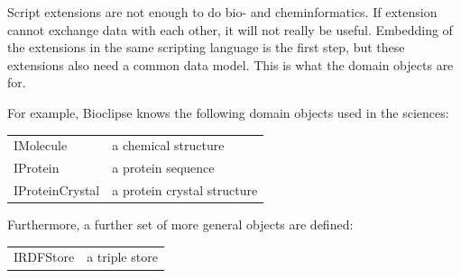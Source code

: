 \documentclass[a5paper, 10pt]{memoir}
\begin{document}
\begin{refsection}
Script extensions are not enough to do bio- and cheminformatics. If extension
cannot exchange data with each other, it will not really be useful. Embedding
of the extensions in the same scripting language is the first step, but
these extensions also need a common data model. This is what the domain objects are
for.

For example, Bioclipse knows the following domain objects used in the sciences:

\vspace{0.25cm}
\begin{tabular}{ l l }
  IMolecule\index{IMolecule}\index{molecule} & a chemical structure \\
  IProtein\index{IProtein}\index{protein} & a protein sequence \\
  IProteinCrystal\index{IProteinCrystal} & a protein crystal structure \\
\end{tabular}
\vspace{0.25cm}

Furthermore, a further set of more general objects are defined:

\vspace{0.25cm}
\begin{tabular}{ l l }
  IRDFStore\index{IRDFStore}\index{RDF} & a triple store \\
\end{tabular}
\vspace{0.25cm}

\printbibliography[heading=subbibliography]
\end{refsection}
\end{document}
